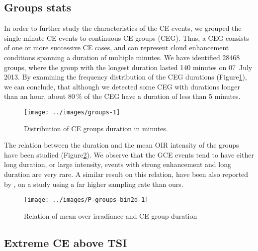\documentclass[preprint, 3p,
authoryear]{elsarticle} %
\begin{document}
\hypertarget{groups-stats}{%
\subsection{Groups stats}\label{groups-stats}}

In order to further study the characteristics of the CE events, we
grouped the single minute CE events to continuous CE groups (CEG). Thus,
a CEG consists of one or more successive CE cases, and can represent
cloud enhancement conditions spanning a duration of multiple minutes. We
have identified 28468 groups, where the group with the longest duration
lasted 140 minutes on 07~July 2013. By examining the frequency
distribution of the CEG durations
(Figure\nobreakspace{}\ref{fig:ceg-duration-distribution}), we can
conclude, that although we detected some CEG with durations longer than
an hour, about \(80\,\%\) of the CEG have a duration of less than 5
minutes.

\begin{figure}

{\centering \texttt{[image: ../images/groups-1]} 

}

\caption{Distribution of CE groups duration in minutes.}\label{fig:ceg-duration-distribution}
\end{figure}

The relation between the duration and the mean OIR intensity of the
groups have been studied (Figure\nobreakspace{}\ref{fig:group-2d}). We
observe that the GCE events tend to have either long duration, or large
intensity, events with strong enhancement and long duration are very
rare. A similar result on this relation, have been also reported by
\citet{Zhang2018}, on a study using a far higher sampling rate than
ours.

\begin{figure}

{\centering \texttt{[image: ../images/P-groups-bin2d-1]} 

}

\caption{Relation of mean over irradiance and CE group duration}\label{fig:group-2d}
\end{figure}

\hypertarget{extreme-ce-above-tsi}{%
\subsection{Extreme CE above TSI}\label{extreme-ce-above-tsi}}
\end{document}
